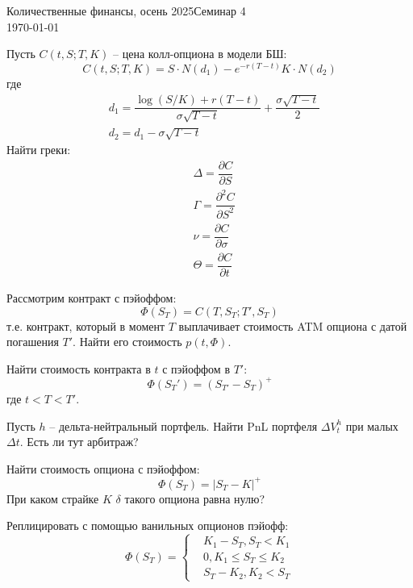 \documentclass[12pt]{article}
\begin{document}
\noindent Количественные финансы, осень 2025\hfill Семинар 4\\
\today

\hrulefill

\begin{problem}
    Пусть $C(t, S; T, K)$ -- цена колл-опциона в модели БШ:
    $$C(t, S; T, K) = S \cdot N(d_1) - e^{-r(T-t)} K \cdot N(d_2)$$
    где 
    \begin{align*}
        &d_1 =\dfrac{\log(S / K) + r(T-t)}{\sigma{\sqrt{T-t}}} + \dfrac{\sigma{\sqrt{T-t}}}{2}\\
        &d_2 = d_1 - \sigma \sqrt{T-t}
    \end{align*}
    Найти греки:
    \begin{align*}
        &\Delta = \dfrac{\partial C}{\partial S} \\
        &\Gamma = \dfrac{\partial^2 C}{\partial S^2} \\
        &\nu = \dfrac{\partial C}{\partial \sigma} \\
        &\Theta = \dfrac{\partial C}{\partial t}
    \end{align*}
\end{problem}

\begin{problem}
    Рассмотрим контракт с пэйоффом:
    $$
        \Phi(S_T) = C(T, S_T; T', S_T)
    $$т.е. контракт, который в момент $T$ выплачивает стоимость ATM опциона с датой погашения $T'$.
    Найти его стоимость $p(t, \Phi)$.
\end{problem}

\begin{problem}
    Найти стоимость контракта в $t$ с пэйоффом в $T'$:
    $$
        \Phi(S_T') = (S_{T'} - S_T)^+
    $$где $t < T < T'$.
\end{problem}

\begin{problem}
    Пусть $h$ -- дельта-нейтральный портфель. Найти PnL портфеля $\Delta V_t^h$ при малых $\Delta t$. Есть ли тут арбитраж?
\end{problem}

\begin{problem}
    Найти стоимость опциона с пэйоффом:
    $$
        \Phi(S_T) = |S_T - K|^+
    $$При каком страйке $K$ $\delta$ такого опциона равна нулю?
\end{problem}

\begin{problem}
    Реплицировать с помощью ванильных опционов пэйофф:
    $$
        \Phi(S_T) = \begin{cases} 
            &K_1 - S_T, S_T < K_1 \\
            &0, K_1 \leq S_T \leq K_2 \\
            &S_T - K_2, K_2 < S_T
         \end{cases}
    $$
\end{problem}
\end{document}
